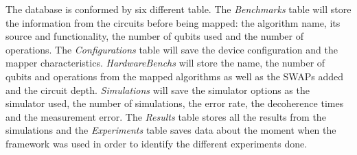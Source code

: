 \begin{enumerate}
The database is conformed by six different table.
The \emph{Benchmarks} table will store the information from the circuits before being mapped: the algorithm name, its source and functionality, the number of qubits used and the number of operations.
The \emph{Configurations} table will save the device configuration and the mapper characteristics.
\emph{HardwareBenchs} will store the name, the number of qubits and operations from the mapped algorithms as well as the SWAPs added and the circuit depth.
\emph{Simulations} will save the simulator options as the simulator used, the number of simulations, the error rate, the decoherence times and the measurement error.
The \emph{Results} table stores all the results from the simulations and the \emph{Experiments} table saves data about the moment when the framework was used in order to identify the different experiments done.
\end{enumerate}

